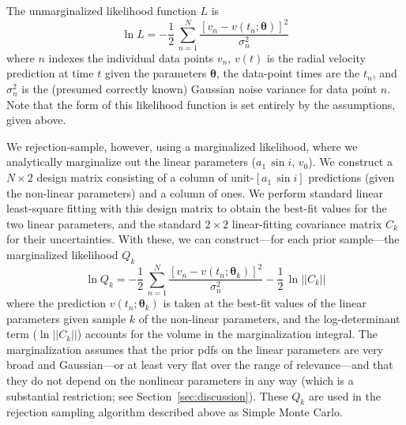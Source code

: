 \documentclass[manuscript, letterpaper]{aastex6}
\newcommand{\asini}{\ensuremath{a_1\,\sin i}}
\newcommand{\bs}[1]{\boldsymbol{#1}}
\begin{document}
The unmarginalized likelihood function $L$ is
\begin{equation}
\ln L = -\frac{1}{2}\,\sum_{n=1}^N \frac{[v_n - v(t_n;\bs{\theta})]^2}{\sigma_n^2}
\end{equation}
where $n$ indexes the individual data points $v_n$, $v(t)$ is the
radial velocity prediction at time $t$ given the parameters $\bs{\theta}$, the
data-point times are the $t_n$, and $\sigma_n^2$ is the (presumed
correctly known) Gaussian noise variance for data point $n$.
Note that the form of this likelihood function is set entirely by
the assumptions, given above.

We rejection-sample, however, using a marginalized likelihood, where
we analytically marginalize out the linear parameters ($\asini$,
$v_0$).
We construct a $N\times 2$ design matrix consisting of a column of
unit-$[\asini]$ predictions (given the non-linear parameters) and a
column of ones.
We perform standard linear least-square fitting with this design
matrix to obtain the best-fit values for the two linear parameters,
and the standard $2\times 2$ linear-fitting covariance matrix $C_k$ for their
uncertainties.
With these, we can construct---for each prior sample---the marginalized likelihood $Q_k$
\begin{equation}
\ln Q_k = -\frac{1}{2}\,\sum_{n=1}^N \frac{[v_n - v(t_n;\bs{\theta}_k)]^2}{\sigma_n^2} -\frac{1}{2}\,\ln ||C_k||
\end{equation}
where the prediction $v(t_n;\bs{\theta}_k)$ is taken at the best-fit values of
the linear parameters given sample $k$ of the non-linear parameters, and the
log-determinant term ($\ln ||C_k||$) accounts for the volume in the
marginalization integral.
The marginalization assumes that the prior pdfs on the linear parameters
are very broad and Gaussian---or
at least very flat over the range of relevance---and that they do not depend
on the nonlinear parameters in any way (which is a substantial restriction;
see Section~\ref{sec:discussion}).
These $Q_k$ are used in the rejection sampling algorithm described above
as Simple Monte Carlo.
\end{document}
